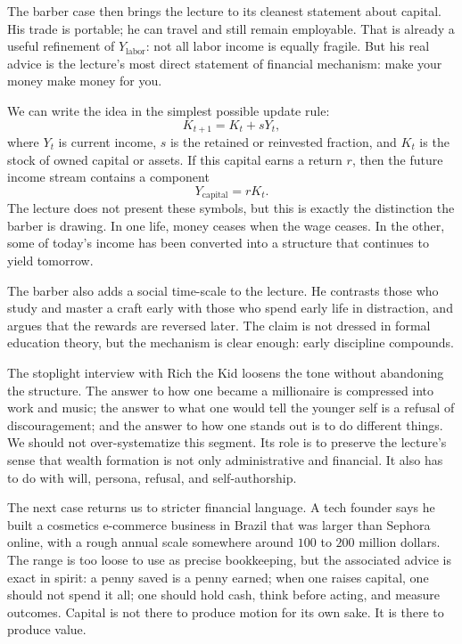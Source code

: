 The barber case then brings the lecture to its cleanest statement about capital. His trade is portable; he can travel and still remain employable. That is already a useful refinement of \(Y_{\mathrm{labor}}\): not all labor income is equally fragile. But his real advice is the lecture's most direct statement of financial mechanism: make your money make money for you.

We can write the idea in the simplest possible update rule:
\begin{equation}
K_{t+1} = K_t + sY_t,
\end{equation}
where \(Y_t\) is current income, \(s\) is the retained or reinvested fraction, and \(K_t\) is the stock of owned capital or assets. If this capital earns a return \(r\), then the future income stream contains a component
\begin{equation}
Y_{\mathrm{capital}} = rK_t.
\end{equation}
The lecture does not present these symbols, but this is exactly the distinction the barber is drawing. In one life, money ceases when the wage ceases. In the other, some of today's income has been converted into a structure that continues to yield tomorrow.

The barber also adds a social time-scale to the lecture. He contrasts those who study and master a craft early with those who spend early life in distraction, and argues that the rewards are reversed later. The claim is not dressed in formal education theory, but the mechanism is clear enough: early discipline compounds.

The stoplight interview with Rich the Kid loosens the tone without abandoning the structure. The answer to how one became a millionaire is compressed into work and music; the answer to what one would tell the younger self is a refusal of discouragement; and the answer to how one stands out is to do different things. We should not over-systematize this segment. Its role is to preserve the lecture's sense that wealth formation is not only administrative and financial. It also has to do with will, persona, refusal, and self-authorship.

The next case returns us to stricter financial language. A tech founder says he built a cosmetics e-commerce business in Brazil that was larger than Sephora online, with a rough annual scale somewhere around \(100\) to \(200\) million dollars. The range is too loose to use as precise bookkeeping, but the associated advice is exact in spirit: a penny saved is a penny earned; when one raises capital, one should not spend it all; one should hold cash, think before acting, and measure outcomes. Capital is not there to produce motion for its own sake. It is there to produce value.

